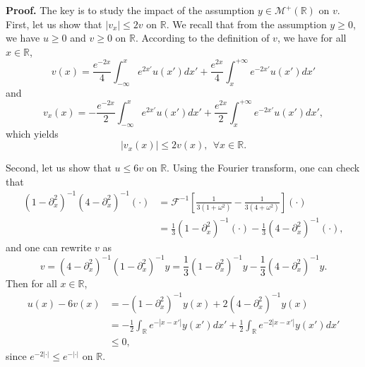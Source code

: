 \documentclass[10pt,a4paper,twoside]{article}
\begin{document}
\noindent
\textbf{Proof.} The key is to study the impact of the assumption $y\in\mathcal{M}^{+}(\mathbb{R})$ on $v$. First, let us show that $|v_{x}|\le 2v$ on $\mathbb{R}$. We recall that from the assumption $y\ge 0$, we have $u\ge 0$ and $v\ge 0$ on $\mathbb{R}$. According to the definition of $v$, we have for all $x\in\mathbb{R}$,
$$v(x)=\frac{e^{-2x}}{4}\int_{-\infty}^{x}e^{2x'}u(x')dx'
+\frac{e^{2x}}{4}\int_{x}^{+\infty}e^{-2x'}u(x')dx'$$
and 
$$v_{x}(x)=-\frac{e^{-2x}}{2}\int_{-\infty}^{x}e^{2x'}u(x')dx'
+\frac{e^{2x}}{2}\int_{x}^{+\infty}e^{-2x'}u(x')dx',$$
which yields
\begin{equation}
|v_{x}(x)|\le 2v(x),~~\forall x\in\mathbb{R}.
\label{P17}
\end{equation}

Second, let us show that $u\le 6v$ on $\mathbb{R}$.  Using the Fourier transform, one can check that
\begin{align} \label{P18}
(1-\partial^{2}_{x})^{-1}(4-\partial^{2}_{x})^{-1}(\cdot)
&=\mathcal{F}^{-1}\left[\frac{1}{3(1+\omega^{2})}-\frac{1}{3(4+\omega^{2})}\right](\cdot)\nonumber\\
&=\frac{1}{3}(1-\partial^{2}_{x})^{-1}(\cdot)
-\frac{1}{3}(4-\partial^{2}_{x})^{-1}(\cdot),
\end{align}
and one can rewrite $v$ as 
\begin{equation}\label{P19}
v=(4-\partial^{2}_{x})^{-1}(1-\partial^{2}_{x})^{-1}y=\frac{1}{3}(1-\partial^{2}_{x})^{-1}y
-\frac{1}{3}(4-\partial^{2}_{x})^{-1}y.
\end{equation}
Then for all $x\in\mathbb{R}$, 
\begin{align}\label{P20}
u(x)-6v(x)&=-(1-\partial^{2}_{x})^{-1}y(x)+2(4-\partial^{2}_{x})^{-1}y(x)\nonumber\\
&=-\frac{1}{2}\int_{\mathbb{R}}e^{-|x-x'|}y(x')dx'
+\frac{1}{2}\int_{\mathbb{R}}e^{-2|x-x'|}y(x')dx'\nonumber\\
&\le 0,
\end{align}
since $e^{-2|\cdot|}\le e^{-|\cdot|}$ on $\mathbb{R}$. 
\end{document}
